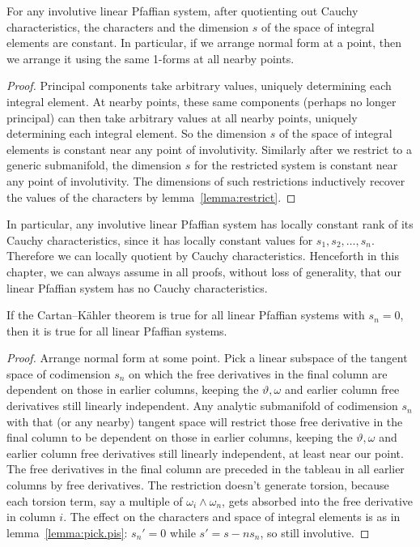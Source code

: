 \begin{lemma}
For any involutive linear Pfaffian system, after quotienting out Cauchy characteristics, the characters and the dimension \(s\) of the space of integral elements are constant.
In particular, if we arrange normal form at a point, then we arrange it using the same 1-forms at all nearby points.
\end{lemma}
\begin{proof}
Principal components take arbitrary values, uniquely determining each integral element.
At nearby points, these same components (perhaps no longer principal) can then take arbitrary values at all nearby points, uniquely determining each integral element.
So the dimension \(s\) of the space of integral elements is constant near any point of involutivity.
Similarly after we restrict to a generic submanifold, the dimension \(s\) for the restricted system is constant near any point of involutivity.
The dimensions of such restrictions inductively recover the values of the characters by lemma~\vref{lemma:restrict}.
\end{proof}

In particular, any involutive linear Pfaffian system has locally constant rank of its Cauchy characteristics, since it has locally constant values for \(s_1, s_2, \dots, s_n\).
Therefore we can locally quotient by Cauchy characteristics.
Henceforth in this chapter, we can always assume in all proofs, without loss of generality, that our linear Pfaffian system has no Cauchy characteristics.

\begin{lemma}\label{lemma:sn.is.zero}
If the Cartan--K\"ahler theorem is true for all linear Pfaffian systems with \(s_n=0\), then it is true for all linear Pfaffian systems.
\end{lemma}
\begin{proof}
Arrange normal form at some point.
Pick a linear subspace of the tangent space of codimension \(s_n\) on which the free derivatives in the final column are dependent on those in earlier columns, keeping the \(\vartheta, \omega\) and earlier column free derivatives still linearly independent.
Any analytic submanifold of codimension \(s_n\) with that (or any nearby) tangent space will restrict those free derivative in the final column to be dependent on those in earlier columns, keeping the \(\vartheta, \omega\) and earlier column free derivatives still linearly independent, at least near our point. 
The free derivatives in the final column are preceded in the tableau in all earlier columns by free derivatives.
The restriction doesn't generate torsion, because each torsion term, say a multiple of \(\omega_i \wedge \omega_n\), gets absorbed into the free derivative in column \(i\).
The effect on the characters and space of integral elements is as in lemma~\vref{lemma:pick.pis}: \(s_n'=0\) while \(s'=s-ns_n\), so still involutive.
\end{proof}


